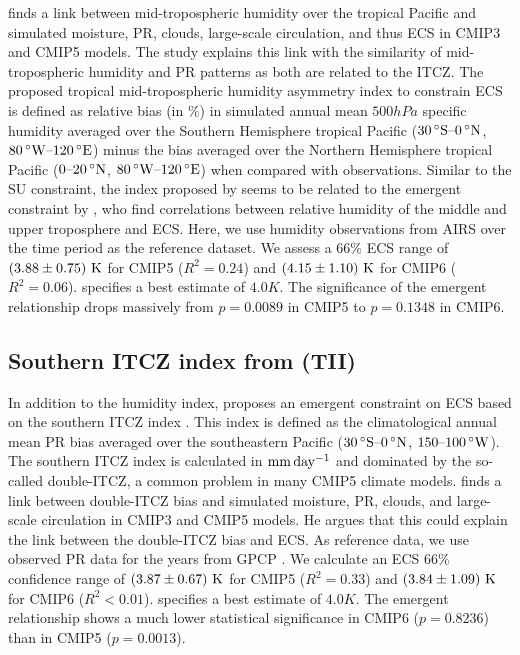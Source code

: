 \textcite{Tian2015} finds a link between mid-tropospheric humidity over the
tropical Pacific and simulated moisture, \acl{PR}, clouds, large-scale
circulation, and thus \ac{ECS} in \acs{CMIP}3 and \acs{CMIP}5 models. The study
explains this link with the similarity of mid-tropospheric humidity and
\acl{PR} patterns as both are related to the \ac{ITCZ}. The proposed tropical
mid-tropospheric humidity asymmetry index to constrain \ac{ECS} is defined as
relative bias (in $\si{\%}$) in simulated annual mean $500 \unit{hPa}$ specific
humidity averaged over the Southern Hemisphere tropical Pacific ($\range{30
  \unit{\degree S}}{0 \unit{\degree N}}$, $\range{80 \unit{\degree W}}{120
  \unit{\degree E}}$) minus the bias averaged over the Northern Hemisphere
tropical Pacific ($\rangeunit{0}{20}{\degree N}$, $\range{80 \unit{\degree
    W}}{120 \unit{\degree E}}$) when compared with observations. Similar to
the SU constraint, the index proposed by \textcite{Tian2015} seems to be
related to the emergent constraint by \textcite{Fasullo2012}, who find
correlations between relative humidity of the middle and upper troposphere and
\ac{ECS}. Here, we use humidity observations from AIRS \autocite{Aumann2003}
over the time period  as the reference dataset. We assess a
$66 \unit{\%}$ \ac{ECS} range of $\pmrangeunit{3.88}{0.75}{K}$ for \acs{CMIP}5
($R^2 = 0.24$) and $\pmrangeunit{4.15}{1.10}{K}$ for \acs{CMIP}6 ($R^2 =
0.06$). \textcite{Tian2015} specifies a best estimate of $4.0 \unit{K}$. The
significance of the emergent relationship drops massively from $p = 0.0089$ in
\acs{CMIP}5 to $p = 0.1348$ in \acs{CMIP}6.


\subsection{Southern \acs{ITCZ} index from (TII)}
\label{subsec:05:tii}

In addition to the humidity index, \textcite{Tian2015} proposes an emergent
constraint on \ac{ECS} based on the southern \ac{ITCZ} index
\autocite{Bellucci2010, Hirota2011}. This index is defined as the
climatological annual mean \acl{PR} bias averaged over the southeastern Pacific
($\range{30 \unit{\degree S}}{0 \unit{\degree N}}$,
$\rangeunit{150}{100}{\degree W}$). The southern \ac{ITCZ} index is calculated
in $\si{\mmday{}}$ and dominated by the so-called double-\ac{ITCZ}, a common
problem in many \acs{CMIP}5 climate models. \textcite{Tian2015} finds a link
between double-\ac{ITCZ} bias and simulated moisture, \acl{PR}, clouds, and
large-scale circulation in \acs{CMIP}3 and \acs{CMIP}5 models. He argues that
this could explain the link between the double-\acs{ITCZ} bias and \ac{ECS}. As
reference data, we use observed \acl{PR} data for the years 
from GPCP \autocite{Adler2003}. We calculate an \ac{ECS} $66 \unit{\%}$
confidence range of $\pmrangeunit{3.87}{0.67}{K}$ for \acs{CMIP}5 ($R^2 =
0.33$) and $\pmrangeunit{3.84}{1.09}{K}$ for \acs{CMIP}6 ($R^2 < 0.01$).
\textcite{Tian2015} specifies a best estimate of $4.0 \unit{K}$. The emergent
relationship shows a much lower statistical significance in \acs{CMIP}6 ($p =
0.8236$) than in \acs{CMIP}5 ($p = 0.0013$).


